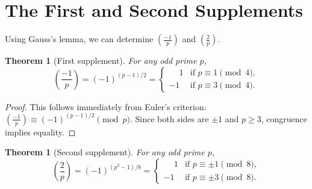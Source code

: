 \documentclass[12pt,a4paper,openany]{book}
\theoremstyle{definition}
\theoremstyle{plain}
\newtheorem{theorem}[definition]{Theorem}
\theoremstyle{remark}
\newcommand{\legendre}[2]{\left(\frac{#1}{#2}\right)}
\begin{document}
\section{The First and Second Supplements}
\label{sec:supplements}

Using Gauss's lemma, we can determine $\legendre{-1}{p}$ and $\legendre{2}{p}$.

\begin{theorem}[First supplement]
\label{thm:first-supplement}
For any odd prime $p$,
\begin{equation}
\label{eq:first-supplement}
  \legendre{-1}{p} = (-1)^{(p-1)/2} =
  \begin{cases}
    \phantom{-}1 & \text{if } p \equiv 1 \pmod{4},\\
    -1           & \text{if } p \equiv 3 \pmod{4}.
  \end{cases}
\end{equation}
\end{theorem}

\begin{proof}
This follows immediately from Euler's criterion: $\legendre{-1}{p} \equiv (-1)^{(p-1)/2} \pmod{p}$.
Since both sides are $\pm 1$ and $p \geq 3$, congruence implies equality.
\end{proof}

\begin{theorem}[Second supplement]
\label{thm:second-supplement}
For any odd prime $p$,
\begin{equation}
\label{eq:second-supplement}
  \legendre{2}{p} = (-1)^{(p^2-1)/8} =
  \begin{cases}
    \phantom{-}1 & \text{if } p \equiv \pm 1 \pmod{8},\\
    -1           & \text{if } p \equiv \pm 3 \pmod{8}.
  \end{cases}
\end{equation}
\end{theorem}
\end{document}
